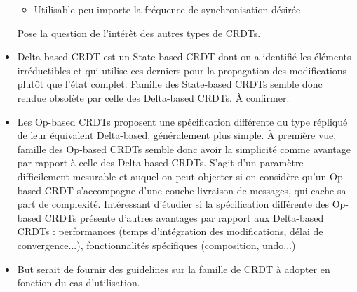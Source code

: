 \begin{itemize}
\begin{itemize}
        \item Utilisable peu importe la fréquence de synchronisation désirée
      \end{itemize}
      Pose la question de l'intérêt des autres types de CRDTs.
    \item Delta-based CRDT est un State-based CRDT dont on a identifié les éléments irréductibles et qui utilise ces derniers pour la propagation des modifications plutôt que l'état complet.
      Famille des State-based CRDTs semble donc rendue obsolète par celle des Delta-based CRDTs.
      À confirmer.
    \item Les Op-based CRDTs proposent une spécification différente du type répliqué de leur équivalent Delta-based, généralement plus simple.
      À première vue, famille des Op-based CRDTs semble donc avoir la simplicité comme avantage par rapport à celle des Delta-based CRDTs.
      S'agit d'un paramètre difficilement mesurable et auquel on peut objecter si on considère qu'un Op-based CRDT s'accompagne d'une couche livraison de messages, qui cache sa part de complexité.
      Intéressant d'étudier si la spécification différente des Op-based CRDTs présente d'autres avantages par rapport aux Delta-based CRDTs : performances (temps d'intégration des modifications, délai de convergence...), fonctionnalités spécifiques (composition, undo...)
    \item But serait de fournir des guidelines sur la famille de CRDT à adopter en fonction du cas d'utilisation.
  \end{itemize}
